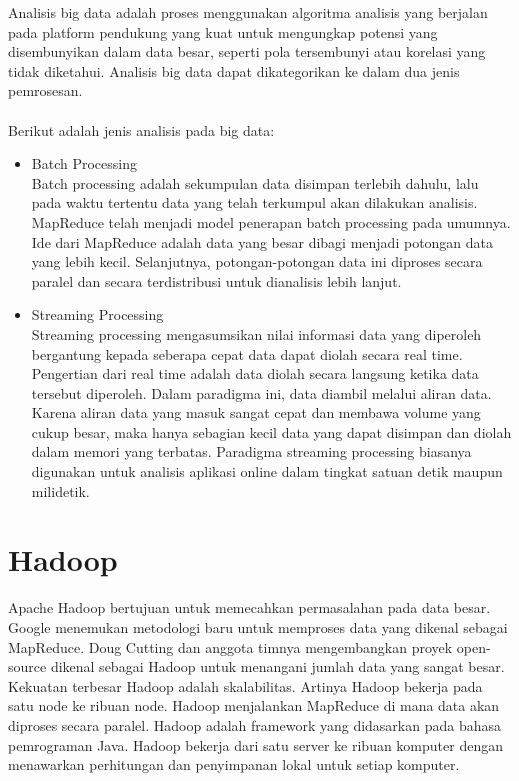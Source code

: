 \noindent Analisis big data adalah proses menggunakan algoritma analisis yang berjalan pada platform pendukung yang kuat untuk mengungkap potensi yang disembunyikan dalam data besar, seperti pola tersembunyi atau korelasi yang tidak diketahui. Analisis big data dapat dikategorikan ke dalam dua jenis pemrosesan.
\\\\
Berikut adalah jenis analisis pada big data:
\begin{itemize}
\item 
Batch Processing\\
Batch processing adalah sekumpulan data disimpan terlebih dahulu, lalu pada waktu tertentu data yang telah terkumpul akan dilakukan analisis. MapReduce telah menjadi model penerapan batch processing pada umumnya. Ide dari MapReduce adalah  data yang besar dibagi menjadi potongan data yang lebih kecil. Selanjutnya, potongan-potongan data ini diproses secara paralel dan secara terdistribusi untuk dianalisis lebih lanjut. 

\item
Streaming Processing\\
Streaming processing mengasumsikan nilai informasi data yang diperoleh bergantung kepada seberapa cepat data dapat diolah secara real time. Pengertian dari real time adalah data diolah secara langsung ketika data tersebut diperoleh. Dalam paradigma ini, data diambil melalui aliran data. Karena aliran data yang masuk sangat cepat dan membawa volume yang cukup besar, maka hanya sebagian kecil data yang dapat disimpan dan diolah dalam memori yang terbatas. Paradigma streaming processing biasanya digunakan untuk analisis aplikasi online dalam tingkat satuan detik maupun milidetik.
\end{itemize}

\newpage
\section{Hadoop}
Apache Hadoop bertujuan untuk memecahkan permasalahan pada data besar. Google menemukan metodologi baru untuk memproses data yang dikenal sebagai MapReduce. Doug Cutting dan anggota timnya mengembangkan proyek open-source dikenal sebagai Hadoop untuk menangani jumlah data yang sangat besar. Kekuatan terbesar Hadoop adalah skalabilitas. Artinya Hadoop bekerja pada satu node ke ribuan node. Hadoop menjalankan MapReduce di mana data akan diproses secara paralel. Hadoop adalah framework yang didasarkan pada bahasa pemrograman Java. Hadoop bekerja dari satu server ke ribuan komputer dengan menawarkan perhitungan dan penyimpanan lokal untuk setiap komputer. 

